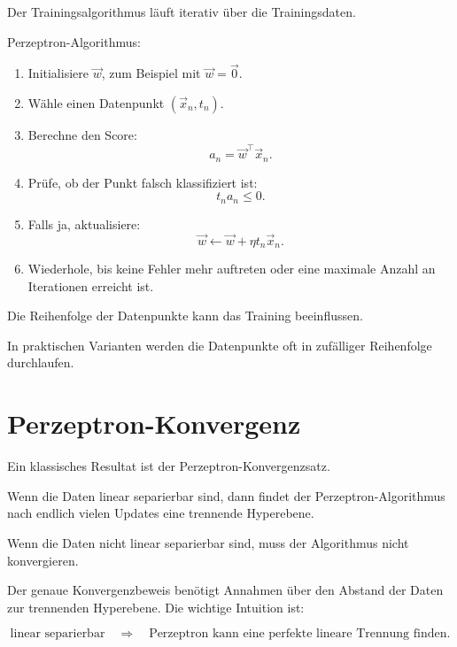 Der Trainingsalgorithmus läuft iterativ über die Trainingsdaten.

\begin{definitionbox}
Perzeptron-Algorithmus:

\begin{enumerate}
    \item Initialisiere \(\vec{w}\), zum Beispiel mit \(\vec{w}=\vec{0}\).
    \item Wähle einen Datenpunkt \((\vec{x}_n,t_n)\).
    \item Berechne den Score:
    \[
        a_n=\vec{w}^{\top}\vec{x}_n.
    \]
    \item Prüfe, ob der Punkt falsch klassifiziert ist:
    \[
        t_na_n\leq 0.
    \]
    \item Falls ja, aktualisiere:
    \[
        \vec{w}
        \leftarrow
        \vec{w}
        +
        \eta t_n\vec{x}_n.
    \]
    \item Wiederhole, bis keine Fehler mehr auftreten oder eine maximale Anzahl an Iterationen erreicht ist.
\end{enumerate}
\end{definitionbox}

\begin{notebox}
Die Reihenfolge der Datenpunkte kann das Training beeinflussen.

In praktischen Varianten werden die Datenpunkte oft in zufälliger Reihenfolge durchlaufen.
\end{notebox}

\section{Perzeptron-Konvergenz}

Ein klassisches Resultat ist der Perzeptron-Konvergenzsatz.

\begin{conceptbox}
Wenn die Daten linear separierbar sind, dann findet der Perzeptron-Algorithmus nach endlich vielen Updates eine trennende Hyperebene.

Wenn die Daten nicht linear separierbar sind, muss der Algorithmus nicht konvergieren.
\end{conceptbox}

Der genaue Konvergenzbeweis benötigt Annahmen über den Abstand der Daten zur trennenden Hyperebene.
Die wichtige Intuition ist:

\[
    \text{linear separierbar}
    \quad
    \Rightarrow
    \quad
    \text{Perzeptron kann eine perfekte lineare Trennung finden}.
\]

